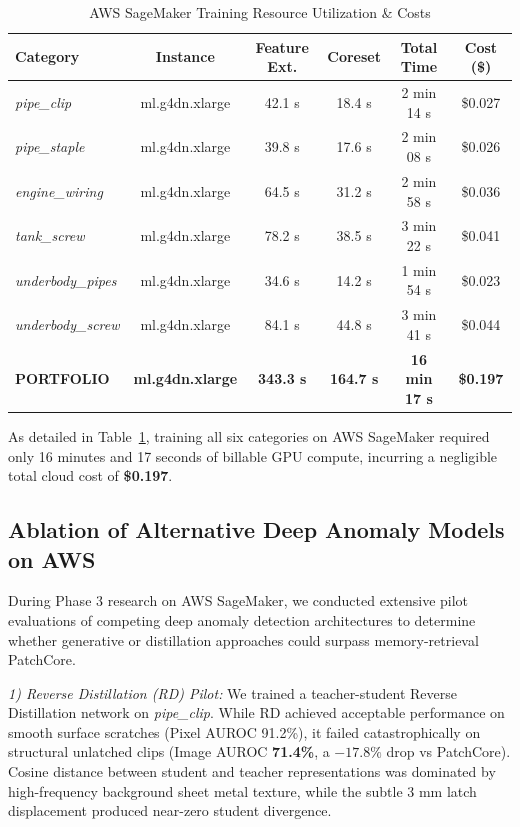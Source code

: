 \documentclass[journal,twocolumn]{IEEEtran}
\begin{document}
\begin{table}[t]
\caption{AWS SageMaker Training Resource Utilization \& Costs}
\label{tab:sagemaker}
\centering
\scriptsize
\begin{tabular}{lccccc}
\toprule
\textbf{Category} & \textbf{Instance} & \textbf{Feature Ext.} & \textbf{Coreset} & \textbf{Total Time} & \textbf{Cost (\$)} \\
\midrule
\textit{pipe\_clip} & ml.g4dn.xlarge & 42.1 s & 18.4 s & 2 min 14 s & \$0.027 \\
\textit{pipe\_staple} & ml.g4dn.xlarge & 39.8 s & 17.6 s & 2 min 08 s & \$0.026 \\
\textit{engine\_wiring} & ml.g4dn.xlarge & 64.5 s & 31.2 s & 2 min 58 s & \$0.036 \\
\textit{tank\_screw} & ml.g4dn.xlarge & 78.2 s & 38.5 s & 3 min 22 s & \$0.041 \\
\textit{underbody\_pipes} & ml.g4dn.xlarge & 34.6 s & 14.2 s & 1 min 54 s & \$0.023 \\
\textit{underbody\_screw} & ml.g4dn.xlarge & 84.1 s & 44.8 s & 3 min 41 s & \$0.044 \\
\midrule
\textbf{PORTFOLIO} & \textbf{ml.g4dn.xlarge} & \textbf{343.3 s} & \textbf{164.7 s} & \textbf{16 min 17 s} & \textbf{\$0.197} \\
\bottomrule
\end{tabular}
\end{table}

As detailed in Table~\ref{tab:sagemaker}, training all six categories on AWS SageMaker required only 16 minutes and 17 seconds of billable GPU compute, incurring a negligible total cloud cost of \textbf{\$0.197}.

\subsection{Ablation of Alternative Deep Anomaly Models on AWS}
During Phase 3 research on AWS SageMaker, we conducted extensive pilot evaluations of competing deep anomaly detection architectures to determine whether generative or distillation approaches could surpass memory-retrieval PatchCore.

\textit{1) Reverse Distillation (RD) Pilot:} We trained a teacher-student Reverse Distillation network on \textit{pipe\_clip}. While RD achieved acceptable performance on smooth surface scratches (Pixel AUROC 91.2\%), it failed catastrophically on structural unlatched clips (Image AUROC \textbf{71.4\%}, a $-17.8\%$ drop vs PatchCore). Cosine distance between student and teacher representations was dominated by high-frequency background sheet metal texture, while the subtle 3 mm latch displacement produced near-zero student divergence.
\end{document}
